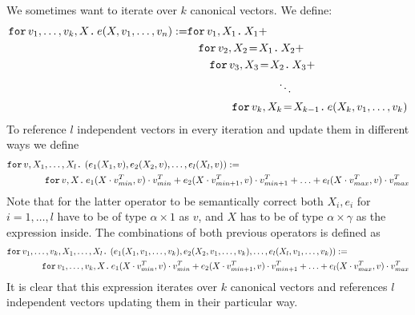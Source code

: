 We sometimes want to iterate over $k$ canonical vectors. We define:
\begin{align*}
  \ffor{v_1,\ldots, v_k}{X}{e(X,v_1,\ldots, v_n)}:= &\ffor{v_1}{X_1}{X_1 +} \\
  &\hspace{1em}\initf{X_1}{v_2}{X_2}{X_2 + } \\
  &\hspace{2em}\initf{X_2}{v_3}{X_3}{X_3 + } \\
  &\hspace{8em}\ddots \\
  &\hspace{4em}\initf{X_{k-1}}{v_k}{X_k}{ e(X_k,v_1,\ldots, v_k)}
\end{align*}
To reference $l$ independent vectors in every iteration and update them in different ways we define
\begin{align*}
&\ffor{v}{X_1,\ldots, X_l}{\left( e_1(X_1,v), e_2(X_2,v), \ldots, e_l(X_l,v) \right)} :=\\
&\hspace{4em}\ffor{v}{X}{e_1(X\cdot v_{min}^T,v)\cdot v_{min}^T + e_2(X\cdot v_{min+1}^T,v)\cdot v_{min+1}^T + \ldots + e_l(X\cdot v_{max}^T,v)\cdot v_{max}^T}
\end{align*}
Note that for the latter operator to be semantically correct both $X_i,e_i$ for $ i=1,\ldots,l$ have to be of type $\alpha\times 1$ as $v$, and $X$ has to be of type $\alpha\times\gamma$ as the expression inside.
The combinations of both previous operators is defined as
\begin{align*}
&\ffor{v_1,\ldots, v_k}{X_1,\ldots, X_l}{\left( e_1(X_1,v_1,\ldots, v_k), e_2(X_2,v_1,\ldots, v_k), \ldots, e_l(X_l,v_1,\ldots, v_k) \right)} :=\\
&\hspace{4em}\ffor{v_1,\ldots, v_k}{X}{e_1(X\cdot v_{min}^T,v)\cdot v_{min}^T + e_2(X\cdot v_{min+1}^T,v)\cdot v_{min+1}^T + \ldots + e_l(X\cdot v_{max}^T,v)\cdot v_{max}^T}
\end{align*}
It is clear that this expression iterates over $k$ canonical vectors and references $l$ independent vectors updating them in their particular way.